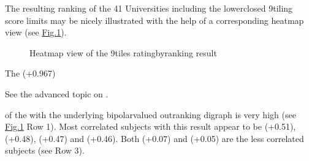 \documentclass[a4paper,12pt,english]{sphinxhowto}
\let\sphinxpxdimen\pdfpxdimen\else\newdimen\sphinxpxdimen
\begin{document}
The resulting ranking of the 41 Universities including the lower\sphinxhyphen{}closed 9\sphinxhyphen{}tiling score limits may be nicely illustrated  with the help of a corresponding heatmap view (see \hyperref[\detokenize{tutorial:ninetiledheatmap}]{Fig.\@ \ref{\detokenize{tutorial:ninetiledheatmap}}}).

\begin{sphinxVerbatim}[commandchars=\\\{\}]
\PYGZbs{}
\end{sphinxVerbatim}

\begin{figure}[H]
\centering
\capstart

\noindent\sphinxincludegraphics[width=650\sphinxpxdimen]{{nineTilingResult}.png}
\caption{Heatmap view of the 9\sphinxhyphen{}tiles rating\sphinxhyphen{}by\sphinxhyphen{}ranking result}\label{\detokenize{tutorial:ninetiledheatmap}}\end{figure}

The  (+0.967) %
\begin{footnote}[35]\sphinxAtStartFootnote
See the advanced topic on .
%
\end{footnote} of the  with the underlying bipolar\sphinxhyphen{}valued outranking digraph is very high (see \hyperref[\detokenize{tutorial:ninetiledheatmap}]{Fig.\@ \ref{\detokenize{tutorial:ninetiledheatmap}}} Row 1). Most correlated subjects with this  result appear to be  (+0.51),  (+0.48),  (+0.47) and  (+0.46). Both  (+0.07) and  (+0.05) are the less correlated subjects (see Row 3).
\end{document}
